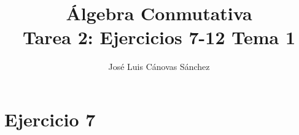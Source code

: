 \documentclass[10pt,a4paper]{article}
\author{José Luis Cánovas Sánchez}
\title{Álgebra Conmutativa\\Tarea 2: Ejercicios 7-12 Tema 1}
\begin{document}
	\maketitle
	
	\section{Ejercicio 7}
	
	
	
	
\end{document}
